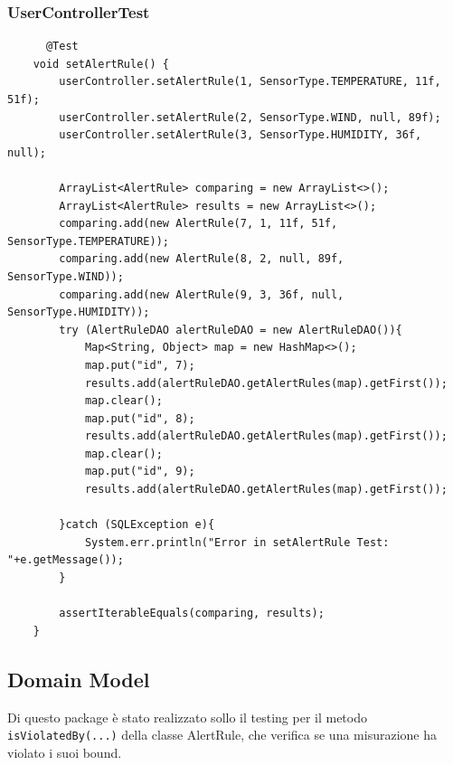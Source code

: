 \documentclass[a4paper, 11pt]{article}
\begin{document}
	\subsubsection{UserControllerTest}
	\begin{lstlisting}
      @Test
    void setAlertRule() {
        userController.setAlertRule(1, SensorType.TEMPERATURE, 11f, 51f);
        userController.setAlertRule(2, SensorType.WIND, null, 89f);
        userController.setAlertRule(3, SensorType.HUMIDITY, 36f, null);

        ArrayList<AlertRule> comparing = new ArrayList<>();
        ArrayList<AlertRule> results = new ArrayList<>();
        comparing.add(new AlertRule(7, 1, 11f, 51f, SensorType.TEMPERATURE));
        comparing.add(new AlertRule(8, 2, null, 89f, SensorType.WIND));
        comparing.add(new AlertRule(9, 3, 36f, null, SensorType.HUMIDITY));
        try (AlertRuleDAO alertRuleDAO = new AlertRuleDAO()){
            Map<String, Object> map = new HashMap<>();
            map.put("id", 7);
            results.add(alertRuleDAO.getAlertRules(map).getFirst());
            map.clear();
            map.put("id", 8);
            results.add(alertRuleDAO.getAlertRules(map).getFirst());
            map.clear();
            map.put("id", 9);
            results.add(alertRuleDAO.getAlertRules(map).getFirst());

        }catch (SQLException e){
            System.err.println("Error in setAlertRule Test: "+e.getMessage());
        }

        assertIterableEquals(comparing, results);
    }
	\end{lstlisting}
	\subsection{Domain Model}
	Di questo package è stato realizzato sollo il testing per il metodo \texttt{isViolatedBy(...)} della classe AlertRule, che verifica se una misurazione ha violato i suoi bound.
\end{document}
